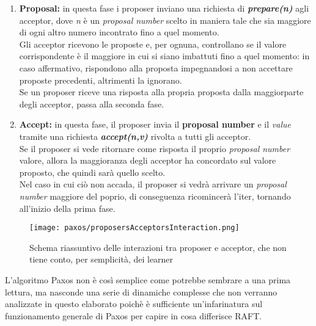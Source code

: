 \begin{enumerate}
	\item \textbf{Proposal:} in questa fase i proposer inviano una richiesta di \textbf{\textit{prepare(n)}} agli acceptor, dove \textit{n} è un \textit{proposal number} scelto in maniera tale che sia maggiore di ogni altro numero incontrato fino a quel momento.\\
  Gli acceptor ricevono le proposte e, per ognuna, controllano se il valore corrispondente è il maggiore in cui si siano imbattuti fino a quel momento: in caso affermativo, rispondono alla proposta impegnandosi a non accettare proposte precedenti, altrimenti la ignorano.\\
  Se un proposer riceve una risposta alla propria proposta dalla maggiorparte degli acceptor, passa alla seconda fase.
	
	\item \textbf{Accept:} in questa fase, il proposer invia il \textbf{proposal number} e il \textit{value} tramite una richiesta \textbf{\textit{accept(n,v)}} rivolta a tutti gli acceptor.\\
  Se il proposer si vede ritornare come risposta il proprio \textit{proposal number} valore, allora la maggioranza degli acceptor ha concordato sul valore proposto, che quindi sarà quello scelto.\\
  Nel caso in cui ciò non accada, il proposer si vedrà arrivare un \textit{proposal number} maggiore del poprio, di conseguenza ricomincerà l'iter, tornando all'inizio della prima fase.
\end{enumerate}

  \begin{figure}[H]
    \centering
    \texttt{[image: paxos/proposersAcceptorsInteraction.png]}
    \caption{Schema riassuntivo delle interazioni tra proposer e acceptor, che non tiene conto, per semplicità, dei learner}
    \label{fig:figure 6}
  \end{figure}

L'algoritmo Paxos non è così semplice come potrebbe sembrare a una prima lettura, ma nasconde una serie di dinamiche complesse che non verranno analizzate in questo elaborato poichè è sufficiente un'infarinatura sul funzionamento generale di Paxos per capire in cosa differisce RAFT. 

